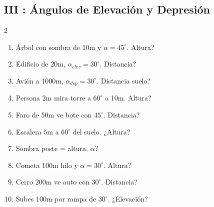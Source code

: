 \documentclass[letterpaper, 12pt]{article}
\begin{document}
\subsection*{III : Ángulos de Elevación y Depresión}
\begin{multicols}{2}
\begin{enumerate}[label=\textbf{\arabic*.}, start=41]
    \item Árbol con sombra de 10m y $\alpha=45^\circ$. Altura?
    \item Edificio de 20m, $\alpha_{elev} = 30^\circ$. Distancia?
    \item Avión a 1000m, $\alpha_{dep} = 30^\circ$. Distancia suelo?
    \item Persona 2m mira torre a $60^\circ$ a 10m. Altura?
    \item Faro de 50m ve bote con $45^\circ$. Distancia?
    \item Escalera 5m a $60^\circ$ del suelo. ¿Altura?
    \item Sombra poste = altura. $\alpha$?
    \item Cometa 100m hilo y $\alpha=30^\circ$. Altura?
    \item Cerro 200m ve auto con $30^\circ$. Distancia?
    \item Subes 100m por rampa de $30^\circ$. ¿Elevación?
\end{enumerate}
\end{multicols}
\end{document}
